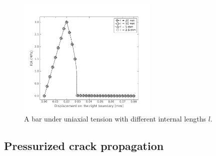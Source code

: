 \begin{figure}[!ht]
  \centering
  \includegraphics[width=0.6\textwidth]{Chapter3/figures/bar_length}
  \caption{A bar under uniaxial tension with different internal lengths $l$.}
  \label{fig:bar_length}
\end{figure}

\subsection{Pressurized crack propagation}
\label{section: Chapter3/verification/propagation}


